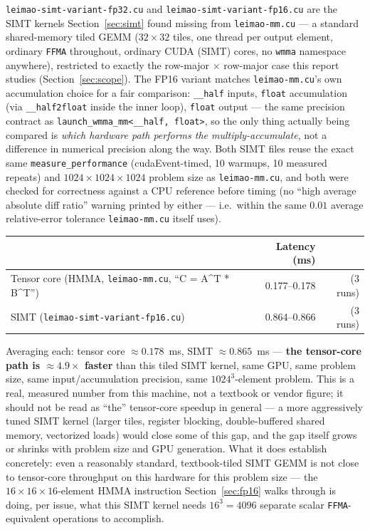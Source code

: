 \documentclass[11pt]{article}
\begin{document}
\texttt{leimao-simt-variant-fp32.cu} and \texttt{leimao-simt-variant-fp16.cu} are the SIMT
kernels Section~\ref{sec:simt} found missing from \texttt{leimao-mm.cu} --- a standard
shared-memory tiled GEMM ($32\times32$ tiles, one thread per output element, ordinary
\texttt{FFMA} throughout, ordinary CUDA (SIMT) cores, no \texttt{wmma} namespace
anywhere), restricted to exactly the row-major $\times$ row-major case this report
studies (Section~\ref{sec:scope}). The FP16 variant matches
\texttt{leimao-mm.cu}'s own accumulation choice for a fair comparison: \texttt{\_\_half}
inputs, \texttt{float} accumulation (via \texttt{\_\_half2float} inside the inner loop),
\texttt{float} output --- the same precision contract as
\texttt{launch\_wmma\_mm<\_\_half, float>}, so the only thing actually being compared is
\emph{which hardware path performs the multiply-accumulate}, not a difference in
numerical precision along the way. Both SIMT files reuse the exact same
\texttt{measure\_performance} (cudaEvent-timed, 10 warmups, 10 measured repeats) and
$1024\times1024\times1024$ problem size as \texttt{leimao-mm.cu}, and both were checked
for correctness against a CPU reference before timing (no ``high average absolute diff
ratio'' warning printed by either --- i.e.\ within the same $0.01$ average relative-error
tolerance \texttt{leimao-mm.cu} itself uses).

\begin{center}
\begin{tabular}{lrr}
\toprule
& Latency (ms) & \\
\midrule
Tensor core (HMMA, \texttt{leimao-mm.cu}, ``C = A\^{}T * B\^{}T'') & 0.177--0.178 & (3 runs) \\
SIMT (\texttt{leimao-simt-variant-fp16.cu}) & 0.864--0.866 & (3 runs) \\
\bottomrule
\end{tabular}
\end{center}

Averaging each: tensor core $\approx 0.178$~ms, SIMT $\approx 0.865$~ms ---
\textbf{the tensor-core path is $\approx\!4.9\times$ faster} than this tiled SIMT kernel,
same GPU, same problem size, same input/accumulation precision, same $1024^3$-element
problem. This is a real, measured number from this machine, not a textbook or vendor
figure; it should not be read as ``the'' tensor-core speedup in general --- a more
aggressively tuned SIMT kernel (larger tiles, register blocking, double-buffered shared
memory, vectorized loads) would close some of this gap, and the gap itself grows or
shrinks with problem size and GPU generation. What it does establish concretely: even a
reasonably standard, textbook-tiled SIMT GEMM is not close to tensor-core throughput on
this hardware for this problem size --- the $16\times16\times16$-element HMMA instruction
Section~\ref{sec:fp16} walks through is doing, per issue, what this SIMT kernel needs
$16^3 = 4096$ separate scalar \texttt{FFMA}-equivalent operations to accomplish.
\end{document}
